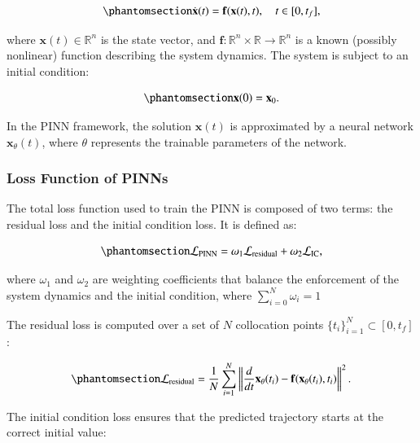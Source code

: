 \documentclass[
  number,
  preprint]{elsarticle}
\begin{document}
\begin{equation}\protect\phantomsection\label{eq-ch3-pinn-ode}{
\dot{\mathbf{x}}(t) = \mathbf{f}(\mathbf{x}(t), t), \quad t \in [0, t_f],
}\end{equation}

where \(\mathbf{x}(t) \in \mathbb{R}^n\) is the state vector, and
\(\mathbf{f} : \mathbb{R}^n \times \mathbb{R} \rightarrow \mathbb{R}^n\)
is a known (possibly nonlinear) function describing the system dynamics.
The system is subject to an initial condition:

\begin{equation}\protect\phantomsection\label{eq-ch3-pinn-ic}{
\mathbf{x}(0) = \mathbf{x}_0.
}\end{equation}

In the PINN framework, the solution \(\mathbf{x}(t)\) is approximated by
a neural network \(\mathbf{x}_{\theta}(t)\), where \(\theta\) represents
the trainable parameters of the network.

\subsubsection{Loss Function of PINNs}\label{loss-function-of-pinns}

The total loss function used to train the PINN is composed of two terms:
the residual loss and the initial condition loss. It is defined as:

\begin{equation}\protect\phantomsection\label{eq-ch3-pinn-loss}{
\mathcal{L}_{\text{PINN}} = \omega_1 \mathcal{L}_{\text{residual}} + \omega_2 \mathcal{L}_{\text{IC}},
}\end{equation}

where \(\omega_1\) and \(\omega_2\) are weighting coefficients that
balance the enforcement of the system dynamics and the initial
condition, where \(\sum_{i=0}^{N}\omega_i = 1\)

The residual loss is computed over a set of \(N\) collocation points
\(\{t_i\}_{i=1}^{N} \subset [0, t_f]\):

\begin{equation}\protect\phantomsection\label{eq-ch3-residual-loss}{
\mathcal{L}_{\text{residual}} = \frac{1}{N} \sum_{i=1}^{N} \left\| \frac{d}{dt} \mathbf{x}_{\theta}(t_i) - \mathbf{f}(\mathbf{x}_{\theta}(t_i), t_i) \right\|^2.
}\end{equation}

The initial condition loss ensures that the predicted trajectory starts
at the correct initial value:
\end{document}
